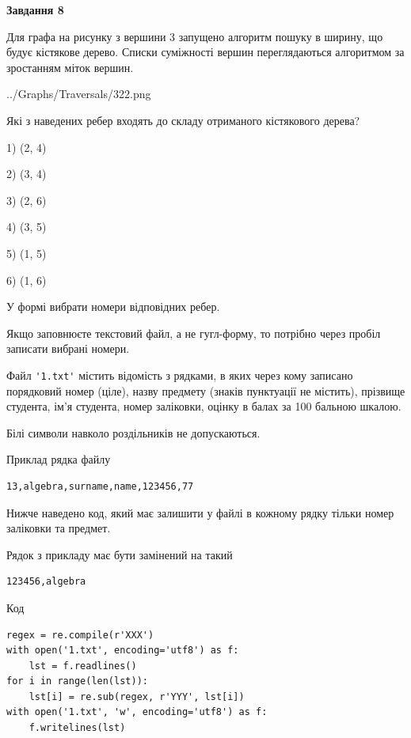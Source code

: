 \documentclass[12pt, ukrainian]{article}
\def\code#1{\Verb!#1!}
\begin{document}
{\begin {large}
{\begin {center}\textbf{Завдання 8}\end {center}}\par
Для графа на рисунку з вершини 3 запущено алгоритм пошуку в ширину, що будує кістякове дерево. Списки суміжності вершин переглядаються алгоритмом за зростанням міток вершин.\par
\begin{center}
	{../Graphs/Traversals/322.png}
\end{center}
\par Які з наведених ребер входять до складу отриманого кістякового дерева?\par
1) (2, 4)\par
2) (3, 4)\par
3) (2, 6)\par
4) (3, 5)\par
5) (1, 5)\par
6) (1, 6)\par
{\vskip 15pt} У формі вибрати номери відповідних ребер.


Якщо заповнюєте текстовий файл, а не гугл-форму, то потрібно через пробіл записа\-ти вибрані номери.\par
\newpage


Файл \code{'1.txt'} містить відомість з рядками, в яких через кому записано поряд\-ковий номер (ціле), назву предмету (знаків пунктуації не містить), прізвище студента, ім'я студента, номер заліковки, оцінку в балах за 100 бальною шкалою.

Білі символи навколо роздільників не допускаються.

Приклад рядка файлу



\begin{verbatim}
13,algebra,surname,name,123456,77
\end{verbatim}


Нижче наведено код, який має залишити у файлі в кожному рядку тільки номер заліковки та предмет.

Рядок з прикладу має бути замінений на такий



\begin{verbatim}
123456,algebra
\end{verbatim}




Код



\begin{verbatim}
regex = re.compile(r'XXX')
with open('1.txt', encoding='utf8') as f:
    lst = f.readlines()
for i in range(len(lst)):
    lst[i] = re.sub(regex, r'YYY', lst[i])
with open('1.txt', 'w', encoding='utf8') as f:
    f.writelines(lst)
\end{verbatim}







\end{large}}
\end{document}

